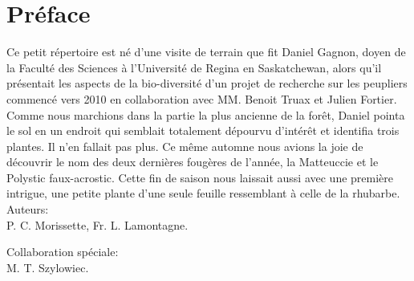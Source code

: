 \chapter*{Préface}

Ce petit répertoire est né d'une visite
de terrain que fit Daniel Gagnon, doyen de la Faculté des Sciences à l’Université de Regina en Saskatchewan, alors qu'il
présentait les aspects de la bio-diversité
d'un projet de recherche sur les peupliers commencé
vers 2010 en collaboration avec MM. Benoit Truax
et Julien Fortier.
Comme nous marchions dans la partie la plus ancienne de la forêt,
Daniel pointa le sol en un endroit qui semblait
totalement dépourvu d'intérêt et identifia trois plantes.
Il n'en fallait pas plus.
Ce même automne nous avions la joie de découvrir
le nom des deux dernières fougères de l'année,
la Matteuccie et le Polystic faux-acrostic.
Cette fin de saison nous laissait aussi avec
une première intrigue, une petite plante d'une seule feuille ressemblant à celle de la rhubarbe. \\
	
Auteurs:\\
P. C. Morissette,
Fr. L. Lamontagne.
	
Collaboration spéciale:\\  
M. T. Szylowiec.
